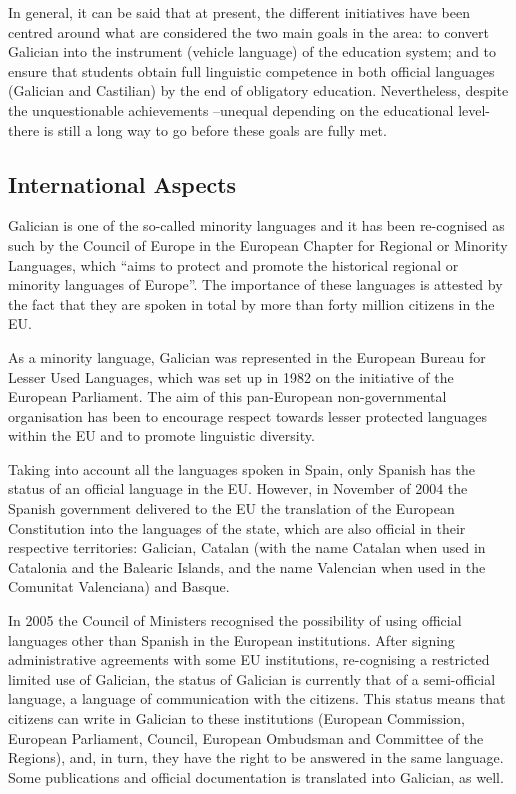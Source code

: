 \begin{multicols}{2}
\begin{itemize}
\begin{multicols}{2}
In general, it can be said that at present, the different initiatives have been centred around what are considered the two main goals in the area: to convert Galician into the instrument (vehicle language) of the education system; and to ensure that students obtain full linguistic competence in both official languages (Galician and Castilian) by the end of obligatory education. Nevertheless, despite the unquestionable achievements –unequal depending on the educational level- there is still a long way to go before these goals are fully met.

\subsection{International Aspects}

Galician is one of the so-called minority languages and it has been re-cognised as such by the Council of Europe in the European Chapter for Regional or Minority Languages, which “aims to protect and promote the historical regional or minority languages of Europe”. The importance of these languages is attested by the fact that they are spoken in total by more than forty million citizens in the EU.

As a minority language, Galician was represented in the European Bureau for Lesser Used Languages, which was set up in 1982 on the initiative of the European Parliament. The aim of this pan-European non-governmental organisation has been to encourage respect towards lesser protected languages within the EU and to promote linguistic diversity.

Taking into account all the languages spoken in Spain, only Spanish has the status of an official language in the EU.  However, in November of 2004 the Spanish government delivered to the EU the translation of the European Constitution into the languages of the state, which are also official in their respective territories: Galician, Catalan (with the name Catalan when used in Catalonia and the Balearic Islands, and the name Valencian when used in the Comunitat Valenciana) and Basque. 

In 2005 the Council of Ministers recognised the possibility of using official languages other than Spanish in the European institutions. After signing administrative agreements with some EU institutions, re-cognising a restricted limited use of Galician, the status of Galician is currently that of a semi-official language, a language of communication with the citizens. This status means that citizens can write in Galician to these institutions (European Commission, European Parliament, Council, European Ombudsman and Committee of the Regions), and, in turn, they have the right to be answered in the same language. Some publications and official documentation is translated into Galician, as well. 


\end{multicols}
\end{itemize}
\end{multicols}
